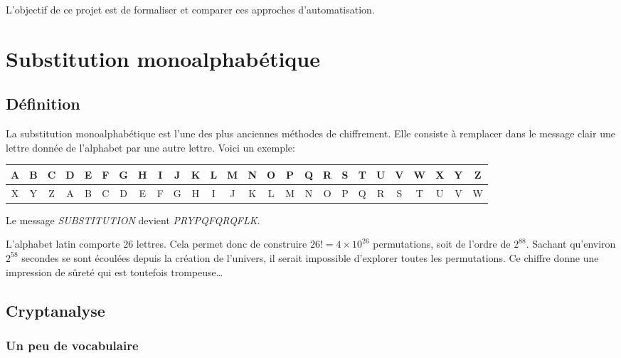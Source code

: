 \documentclass[a4paper]{article}
\begin{document}
L’objectif de ce projet est de formaliser et comparer ces approches d’automatisation. 

\section{Substitution monoalphabétique}

\subsection{Définition}

La substitution monoalphabétique est l'une des plus anciennes méthodes de chiffrement. Elle consiste à remplacer dans le message clair une lettre donnée de l'alphabet par une autre lettre. Voici un exemple:

\vspace{1em}
\begin{adjustbox}{width=\textwidth,center}
    \begin{tabular}{|c|c|c|c|c|c|c|c|c|c|c|c|c|c|c|c|c|c|c|c|c|c|c|c|c|c|}
        \hline
        A & B & C & D & E & F & G & H & I & J & K & L & M & N & O & P & Q & R & S & T & U & V & W & X & Y & Z \\
        \hline
        X & Y & Z & A & B & C & D & E & F & G & H & I & J & K & L & M & N & O & P & Q & R & S & T & U & V & W \\
        \hline
    \end{tabular}
\end{adjustbox}
\vspace{1em}


Le message \textit{SUBSTITUTION} devient \textit{PRYPQFQRQFLK}.


L'alphabet latin comporte 26 lettres. Cela permet donc de construire $26! = 4 \times 10^{26}$ permutations, soit de l'ordre de $2^{88}$.  
Sachant qu’environ $2^{58}$ secondes se sont écoulées depuis la création de l’univers, il serait impossible d’explorer toutes les permutations.  
Ce chiffre donne une impression de sûreté qui est toutefois trompeuse\ldots

\subsection{Cryptanalyse}

\subsubsection{Un peu de vocabulaire}
\end{document}
